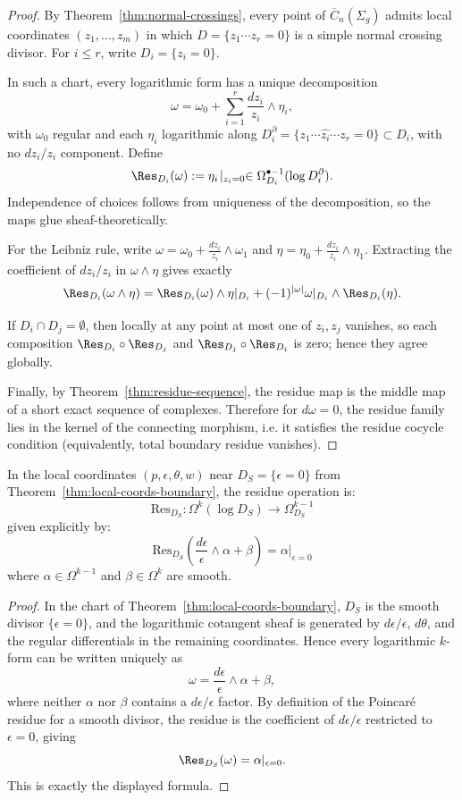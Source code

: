 \begin{proof}
By Theorem~\ref{thm:normal-crossings}, every point of $\overline{C}_n(\Sigma_g)$
admits local coordinates $(z_1,\dots,z_m)$ in which
$D=\{z_1\cdots z_r=0\}$ is a simple normal crossing divisor.
For $i\le r$, write $D_i=\{z_i=0\}$.

In such a chart, every logarithmic form has a unique decomposition
\[
\omega=\omega_0+\sum_{i=1}^r \frac{dz_i}{z_i}\wedge \eta_i,
\]
with $\omega_0$ regular and each $\eta_i$ logarithmic along
$D_i^\partial=\{z_1\cdots \widehat{z_i}\cdots z_r=0\}\subset D_i$, with no
$dz_i/z_i$ component. Define
\[
\Res_{D_i}(\omega):=\eta_i\!\mid_{z_i=0}\in
\Omega^{\bullet-1}_{D_i}(\log D_i^\partial).
\]
Independence of choices follows from uniqueness of the decomposition, so the maps
glue sheaf-theoretically.

For the Leibniz rule, write
$\omega=\omega_0+\frac{dz_i}{z_i}\wedge\omega_1$ and
$\eta=\eta_0+\frac{dz_i}{z_i}\wedge\eta_1$.
Extracting the coefficient of $dz_i/z_i$ in $\omega\wedge\eta$ gives exactly
\[
\Res_{D_i}(\omega\wedge\eta)=
\Res_{D_i}(\omega)\wedge \eta|_{D_i}
 +(-1)^{|\omega|}\omega|_{D_i}\wedge\Res_{D_i}(\eta).
\]

If $D_i\cap D_j=\emptyset$, then locally at any point at most one of $z_i,z_j$
vanishes, so each composition
$\Res_{D_i}\circ\Res_{D_j}$ and $\Res_{D_j}\circ\Res_{D_i}$ is zero; hence they
agree globally.

Finally, by Theorem~\ref{thm:residue-sequence}, the residue map is the middle map
of a short exact sequence of complexes. Therefore for $d\omega=0$, the residue
family lies in the kernel of the connecting morphism, i.e. it satisfies the
residue cocycle condition (equivalently, total boundary residue vanishes).
\end{proof}

\begin{proposition}\label{prop:residue-local}
In the local coordinates $(p, \epsilon, \theta, w)$ near $D_S = \{\epsilon = 0\}$ from Theorem~\ref{thm:local-coords-boundary}, the residue operation is:
\[\text{Res}_{D_S}: \Omega^k(\log D_S) \to \Omega^{k-1}_{D_S}\]
given explicitly by:
\[\text{Res}_{D_S}\left(\frac{d\epsilon}{\epsilon} \wedge \alpha + \beta\right) = \alpha|_{\epsilon=0}\]
where $\alpha \in \Omega^{k-1}$ and $\beta \in \Omega^k$ are smooth.
\end{proposition}

\begin{proof}
In the chart of Theorem~\ref{thm:local-coords-boundary}, $D_S$ is the smooth
divisor $\{\epsilon=0\}$, and the logarithmic cotangent sheaf is generated by
$d\epsilon/\epsilon$, $d\theta$, and the regular differentials in the remaining
coordinates. Hence every logarithmic $k$-form can be written uniquely as
\[
\omega=\frac{d\epsilon}{\epsilon}\wedge\alpha+\beta,
\]
where neither $\alpha$ nor $\beta$ contains a $d\epsilon/\epsilon$ factor.
By definition of the Poincar\'e residue for a smooth divisor, the residue is the
coefficient of $d\epsilon/\epsilon$ restricted to $\epsilon=0$, giving
\[
\Res_{D_S}(\omega)=\alpha|_{\epsilon=0}.
\]
This is exactly the displayed formula.
\end{proof}

